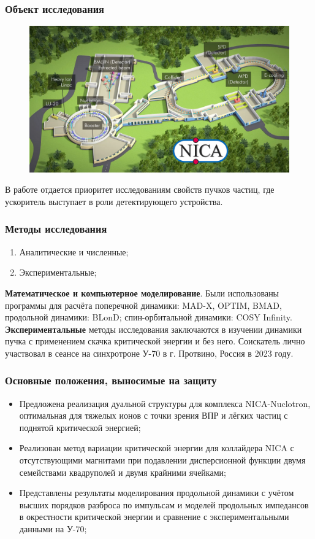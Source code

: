 \begin{frame}
	\frametitle{Объект исследования}
	\begin{figure}
		\centering
		\includegraphics[width=0.6\linewidth]{images/NICA}
	\end{figure}
	В работе отдается приоритет исследованиям свойств пучков частиц, где ускоритель выступает в роли детектирующего устройства.
\end{frame}
\begin{frame}
	\frametitle{Методы исследования}
	\begin{enumerate}
		\item	Аналитические и численные;
		\item	Экспериментальные;
	\end{enumerate}
	\vspace{2em}
	\textbf{Математическое и компьютерное моделирование}. Были использованы программы для расчёта поперечной динамики: MAD-X, OPTIM, BMAD, продольной динамики: BLonD; спин-орбитальной динамики: COSY Infinity.\\
	\vspace{1em}
	\textbf{Экспериментальные} методы исследования заключаются в изучении динамики пучка с применением скачка критической энергии и без него.
	Соискатель лично участвовал в сеансе на синхротроне У-70 в г. Протвино, Россия в 2023 году.

\end{frame}
\begin{frame}
	\frametitle{Основные положения, выносимые на защиту}
	\begin{itemize}
		\item 	Предложена реализация дуальной структуры для комплекса NICA-Nuclotron, оптимальная для тяжелых ионов с точки зрения ВПР и лёгких частиц с поднятой критической энергией;
		\vspace{1em}
		\item	Реализован метод вариации критической энергии для коллайдера NICA с отсутствующими магнитами при подавлении дисперсионной функции двумя семействами квадруполей и двумя крайними ячейками;
		\vspace{1em}
		\item	Представлены результаты моделирования продольной динамики с учётом высших порядков разброса по импульсам и моделей продольных импедансов в окрестности критической энергии и сравнение с экспериментальными данными на У-70;
	\end{itemize}
\end{frame}

